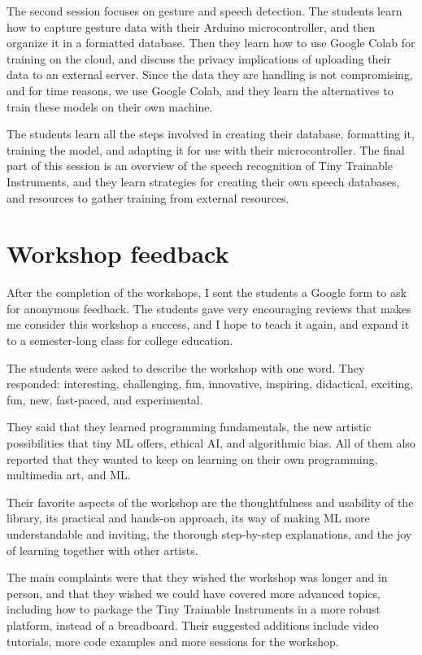 The second session focuses on gesture and speech detection. The students learn how to capture gesture data with their Arduino microcontroller, and then organize it in a formatted database. Then they learn how to use Google Colab for training on the cloud, and discuss the privacy implications of uploading their data to an external server. Since the data they are handling is not compromising, and for time reasons, we use Google Colab, and they learn the alternatives to train these models on their own machine.

The students learn all the steps involved in creating their database, formatting it, training the model, and adapting it for use with their microcontroller. The final part of this session is an overview of the speech recognition of Tiny Trainable Instruments, and they learn strategies for creating their own speech databases, and resources to gather training from external resources.

\section{Workshop feedback}

After the completion of the workshops, I sent the students a Google form to ask for anonymous feedback. The students gave very encouraging reviews that makes me consider this workshop a success, and I hope to teach it again, and expand it to a semester-long class for college education. 

The students were asked to describe the workshop with one word. They responded: interesting, challenging, fun, innovative, inspiring, didactical, exciting, fun, new, fast-paced, and experimental.

They said that they learned programming fundamentals, the new artistic possibilities that tiny \acrshort{ML} offers, ethical \acrshort{AI}, and algorithmic bias. All of them also reported that they wanted to keep on learning on their own programming, multimedia art, and \acrshort{ML}.

Their favorite aspects of the workshop are the thoughtfulness and usability of the library, its practical and hands-on approach, its way of making \acrshort{ML} more understandable and inviting, the thorough step-by-step explanations, and the joy of learning together with other artists.

The main complaints were that they wished the workshop was longer and in person, and that they wished we could have covered more advanced topics, including how to package the Tiny Trainable Instruments in a more robust platform, instead of a breadboard. Their suggested additions include video tutorials, more code examples and more sessions for the workshop.

